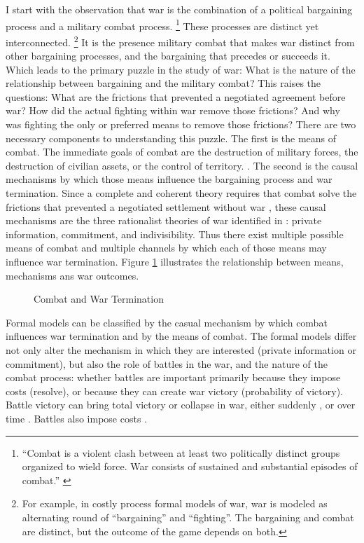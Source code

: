 I start with the observation that war is the combination of a political bargaining process and a military combat process. %
\footnote{%
  ``Combat is a violent clash between at least two politically
  distinct groups organized to wield force. War consists of sustained
  and substantial episodes of combat.'' \parencite{Reiter2003} %
} %
These processes are distinct yet interconnected.%
\footnote{%
  For example, in costly process formal models of war, war is modeled
  as alternating round of ``bargaining'' and ``fighting''. %
  The bargaining and combat are distinct, but the outcome of the game
  depends on both. %
} %
It is the presence military combat that makes war distinct from other bargaining processes, and the bargaining that precedes or succeeds it. %
Which leads to the primary puzzle in the study of war: What is the nature of the relationship between bargaining and the military combat?
This raises the questions:
What are the frictions that prevented a negotiated agreement before war?
How did the actual fighting within war remove those frictions?
And why was fighting the only or preferred means to remove those frictions?
There are two necessary components to understanding this puzzle. %
The first is the means of combat. %
The immediate goals of combat are the destruction of military forces, the destruction of civilian assets, or the control of territory.
\parencite[30]{Reiter2003}. %
The second is the causal mechanisms by which those means influence the bargaining process and war termination. %
Since a complete and coherent theory requires that combat solve the frictions that prevented a negotiated settlement without war \parencite{LeventogluSlantchev2007}, these causal mechanisms are the three rationalist theories of war identified in \textcite{Fearon1995}: private information, commitment, and indivisibility. %
Thus there exist multiple possible means of combat and multiple channels by which each of those means may influence war termination.
Figure \ref{bonds_battles:fig:combat-causal-diagram} illustrates the relationship between means, mechanisms ans war outcomes.

\begin{figure}[htpb]
  \centering
  
  \caption{Combat and War Termination}
  \label{bonds_battles:fig:combat-causal-diagram}
\end{figure}

Formal models can be classified by the casual mechanism by which combat influences war termination and by the means of combat. %
The formal models differ not only alter the mechanism in which they are interested (private information or commitment), but also the role of battles in the war, and the nature of the combat process: whether battles are important primarily because they impose costs (resolve), or because they can create war victory (probability of victory). %
Battle victory can bring total victory or collapse in war, either suddenly \parencites{Powell2004}{Wagner2000}{LeventogluSlantchev2007}, or over time \parencites{Slantchev2003}{SmithStam2004}.
Battles also impose costs \parencites{FilsonWerner2002}{Powell2004}{LeventogluSlantchev2007}. %

